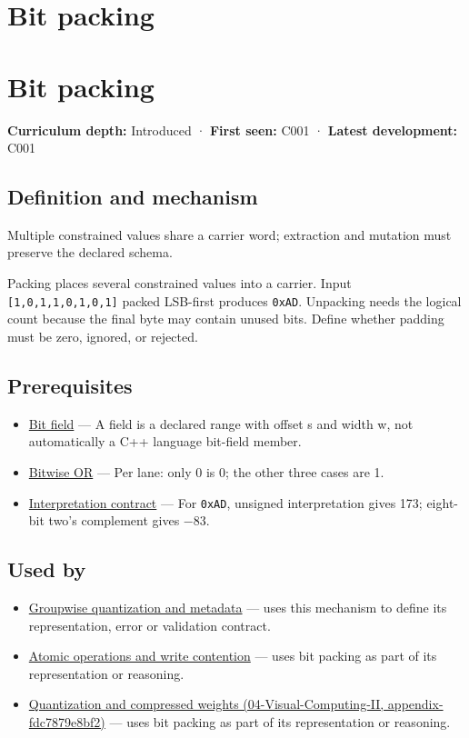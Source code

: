 \hypertarget{appendix-1f9963e1a5d1}{}
\section*{Bit packing}
\section{Bit packing}\label{bit-packing}

\textbf{Curriculum depth:} Introduced · \textbf{First seen:} C001 · \textbf{Latest development:} C001

\subsection{Definition and mechanism}\label{definition-and-mechanism}

Multiple constrained values share a carrier word; extraction and mutation must preserve the declared schema.

Packing places several constrained values into a carrier. Input \texttt{{[}1,0,1,1,0,1,0,1{]}} packed LSB-first produces \texttt{0xAD}. Unpacking needs the logical count because the final byte may contain unused bits. Define whether padding must be zero, ignored, or rejected.

\subsection{Prerequisites}\label{prerequisites}

\begin{itemize}
\tightlist
\item
  \hyperref[appendix-ac697f5c66e8]{Bit field} --- A field is a declared range with offset s and width w, not automatically a C++ language bit-field member.
\item
  \hyperref[appendix-a427ce8ce8a6]{Bitwise OR} --- Per lane: only 0 is 0; the other three cases are 1.
\item
  \hyperref[appendix-f414bd4ed05c]{Interpretation contract} --- For \texttt{0xAD}, unsigned interpretation gives 173; eight-bit two's complement gives −83.
\end{itemize}

\subsection{Used by}\label{used-by}

\begin{itemize}
\item
  \hyperref[appendix-638204c40e8b]{Groupwise quantization and metadata} --- uses this mechanism to define its representation, error or validation contract.
\item
  \hyperref[appendix-e12d1b03fefb]{Atomic operations and write contention} --- uses bit packing as part of its representation or reasoning.
\item
  \href{}{Quantization and compressed weights (04-Visual-Computing-II, appendix-fdc7879e8bf2)} --- uses bit packing as part of its representation or reasoning.
\end{itemize}

